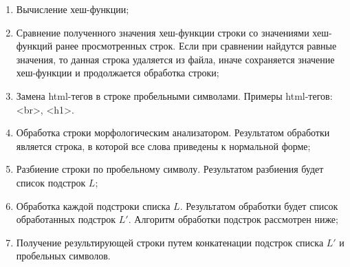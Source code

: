 \documentclass[a4paper]{report}
\begin{document}
	\begin{enumerate}
	\item{ Вычисление хеш-функции; }
	\item{ Сравнение полученного значения хеш-функции строки со значениями хеш-функций ранее просмотренных строк. Если при сравнении найдутся равные значения, то данная строка удаляется из файла, иначе сохраняется значение хеш-функции и продолжается обработка строки; }
	
	\item{ Замена html-тегов в строке пробельными символами. Примеры html-тегов: <br>, <h1>. }
	
	\item{ Обработка строки морфологическим анализатором. Результатом обработки является строка, в которой все слова приведены к нормальной форме; }
	\item{ Разбиение строки по пробельному символу. Результатом разбиения будет список подстрок $L$; }
	\item{ Обработка каждой подстроки списка $L$. Результатом обработки будет список обработанных подстрок $L'$. Алгоритм обработки подстрок рассмотрен ниже;}
	\item{ Получение результирующей строки путем конкатенации подстрок списка $L'$ и пробельных символов.}
	\end{enumerate}
	
\end{document}
